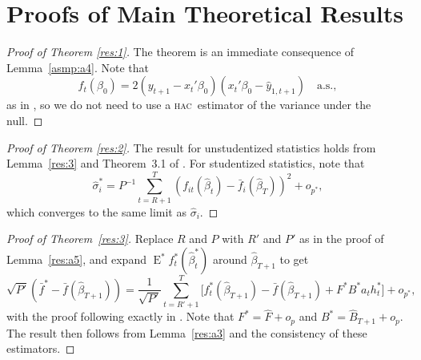 \documentclass[12pt]{article}
\theoremstyle{definition}
\DeclareMathOperator{\E}{E}
\newcommand{\hac}{\textsc{hac}}
\begin{document}
\section{Proofs of Main Theoretical Results}

\begin{proof}[Proof of Theorem \ref{res:1}]
  The theorem is an immediate consequence of Lemma~\ref{asmp:a4}.
  Note that \[f_t(\beta_0)= 2 (y_{t+1} - x_t'\beta_0)(x_t'\beta_0 -
  \hat{y}_{1,t+1}) \quad \text{a.s.},\] as in \citet{ClW:07}, so we do
  not need to use a \hac\ estimator of the variance under the null.
\end{proof}

\begin{proof}[Proof of Theorem \ref{res:2}]
  The result for unstudentized statistics holds from Lemma~\ref{res:3}
  and Theorem~3.1 of \citet{RoW:05}.  For studentized statistics, note
  that
  \begin{equation}
    \hat{\sigma}_i^{*} = P^{-1} \sum_{t=R+1}^T (f_{it}(\hat{\beta}_t)
    - \bar{f}_i(\hat{\beta}_T))^2 + o_{p^{*}},
  \end{equation}
  which converges to the same limit as $\hat{\sigma}_i$.
\end{proof}

\begin{proof}[Proof of Theorem~\ref{res:3}]
  Replace $R$ and $P$ with $R'$ and $P'$ as in the proof
  of Lemma~\ref{res:a5}, and expand $\E^{*}
  f_t^{*}(\hat{\beta}_t^{*})$ around $\hat{\beta}_{T+1}$ to get
  \begin{equation}
    \sqrt{P'} (\bar{f}^{*} - \bar{f}(\hat{\beta}_{T+1})) =
    \frac{1}{\sqrt{P'}} \sum_{t=R'+1}^T
    \big[f_t^{*}(\hat{\beta}_{T+1}) - \bar{f}(\hat{\beta}_{T+1}) +
    F^{*} B^{*} a_t h_t^{*} \big] + o_{p^{*}},
  \end{equation}
  with the proof following exactly in \citet[Theorem 2.3.1]{Mcc:00}.
  Note that $F^{*} = \hat{F} + o_{p}$ and $B^{*} = \hat{B}_{T+1} +
  o_{p}$.  The result then follows from Lemma~\ref{res:a3} and the
  consistency of these estimators.
\end{proof}


\end{document}
